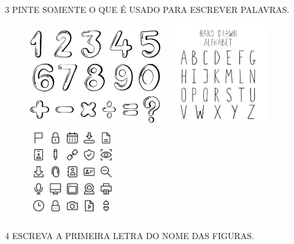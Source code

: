 
\num{3} PINTE SOMENTE O QUE É USADO PARA ESCREVER PALAVRAS.

\begin{figure}[htpb!]
\includegraphics[width=2.23393in,height=1.58569in]{media/image6.png}
\includegraphics[width=1.96211in,height=1.66818in]{media/image7.png}
\includegraphics[width=1.56875in,height=1.56875in]{media/image8.png}
\end{figure}



\pagebreak
\num{4} ESCREVA A PRIMEIRA LETRA DO NOME DAS FIGURAS.\bigskip


